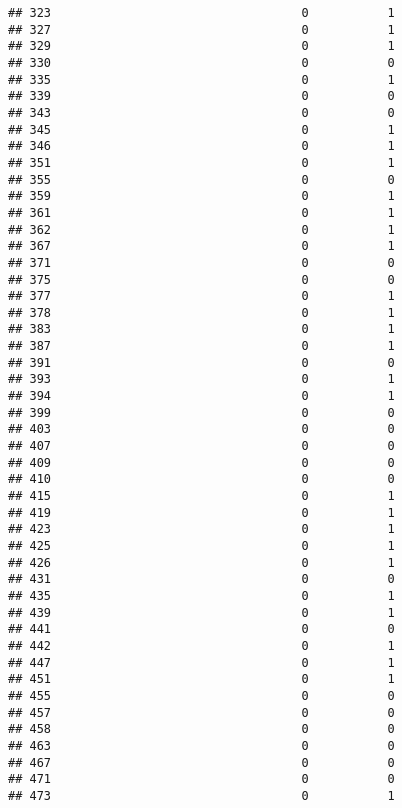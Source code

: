 \documentclass[
]{article}
\begin{document}
\begin{verbatim}
## 323                                   0           1
## 327                                   0           1
## 329                                   0           1
## 330                                   0           0
## 335                                   0           1
## 339                                   0           0
## 343                                   0           0
## 345                                   0           1
## 346                                   0           1
## 351                                   0           1
## 355                                   0           0
## 359                                   0           1
## 361                                   0           1
## 362                                   0           1
## 367                                   0           1
## 371                                   0           0
## 375                                   0           0
## 377                                   0           1
## 378                                   0           1
## 383                                   0           1
## 387                                   0           1
## 391                                   0           0
## 393                                   0           1
## 394                                   0           1
## 399                                   0           0
## 403                                   0           0
## 407                                   0           0
## 409                                   0           0
## 410                                   0           0
## 415                                   0           1
## 419                                   0           1
## 423                                   0           1
## 425                                   0           1
## 426                                   0           1
## 431                                   0           0
## 435                                   0           1
## 439                                   0           1
## 441                                   0           0
## 442                                   0           1
## 447                                   0           1
## 451                                   0           1
## 455                                   0           0
## 457                                   0           0
## 458                                   0           0
## 463                                   0           0
## 467                                   0           0
## 471                                   0           0
## 473                                   0           1

\end{verbatim}
\end{document}
